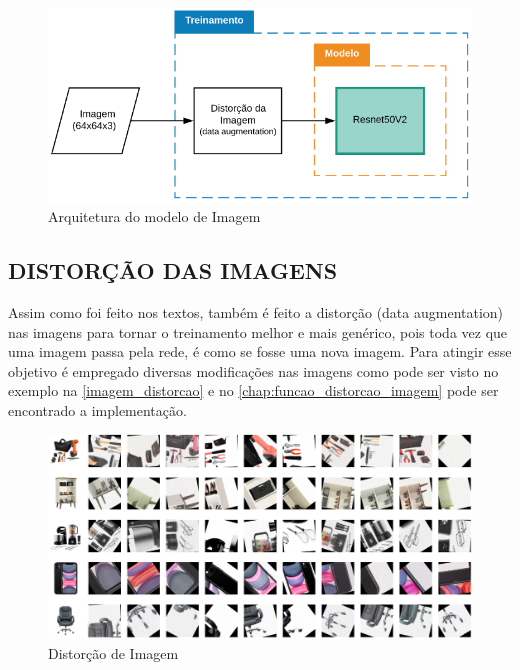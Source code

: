\begin{figure}[htb]
	\caption{\label{modelo_imagem_macro} Arquitetura do modelo de Imagem}
	\begin{center}
	    \includegraphics[scale=0.5]{artigo/recursos/imagens/modelo_imagem_macro.png}
	\end{center}
\end{figure}


\subsection{DISTORÇÃO DAS IMAGENS}

Assim como foi feito nos textos, também é feito a distorção (data augmentation) nas imagens para tornar o treinamento melhor e mais genérico, pois toda vez que uma imagem passa pela rede, é como se fosse uma nova imagem. Para atingir esse objetivo é empregado diversas modificações nas imagens como pode ser visto no exemplo na \autoref{imagem_distorcao} e no \autoref{chap:funcao_distorcao_imagem} pode ser encontrado a implementação.

\begin{figure}[htb]
	\caption{\label{imagem_distorcao} Distorção de Imagem}
	\begin{center}
	    \includegraphics[width=\textwidth]{artigo/recursos/imagens/imagem_distorcao.png}
	\end{center}
\end{figure}

